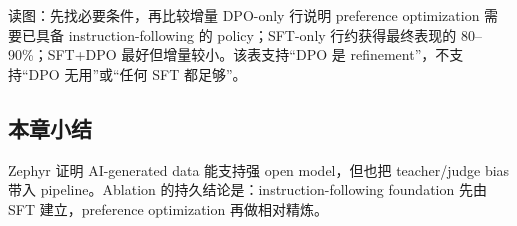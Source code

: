 \begin{knowledgebox}{读图：先找必要条件，再比较增量}
DPO-only 行说明 preference optimization 需要已具备 instruction-following 的 policy；SFT-only 行约获得最终表现的 80--90\%；SFT+DPO 最好但增量较小。该表支持“DPO 是 refinement”，不支持“DPO 无用”或“任何 SFT 都足够”。
\end{knowledgebox}


\subsection{本章小结}

Zephyr 证明 AI-generated data 能支持强 open model，但也把 teacher/judge bias 带入 pipeline。Ablation 的持久结论是：instruction-following foundation 先由 SFT 建立，preference optimization 再做相对精炼。


